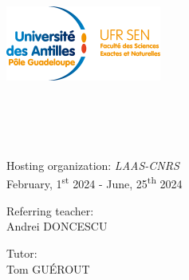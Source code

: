 \begin{titlepage}
	\begin{center}
		\includegraphics[scale=1.80]{../images/logo_ufr_sen.png} \\[2cm]
		\hspace{2cm}

		\HRule \\[0.4cm]
		\@title \\[0.4cm]
		\HRule \\[1cm]

		\@author \\ [1.5cm]

		{\large Hosting organization: \textsl{LAAS-CNRS}} \\[1.5cm]

		{\large February, 1\textsuperscript{st} 2024 - June, 25\textsuperscript{th} 2024} \\[1.5cm]

		\begin{minipage}{0.7\textwidth}
			\begin{flushleft}
				Referring teacher:\\
				\hspace{0.2cm}  Andrei \textsc{DONCESCU}
			\end{flushleft}
		\end{minipage}

		\vspace{-0.85cm}
		\hspace{9cm}
		\begin{minipage}{0.3\textwidth}
			\begin{flushleft}
				Tutor:\\
				\hspace{0.2cm} Tom \textsc{GUÉROUT}
			\end{flushleft}
		\end{minipage}\\[3cm]

		\@date
	\end{center}
\end{titlepage}
